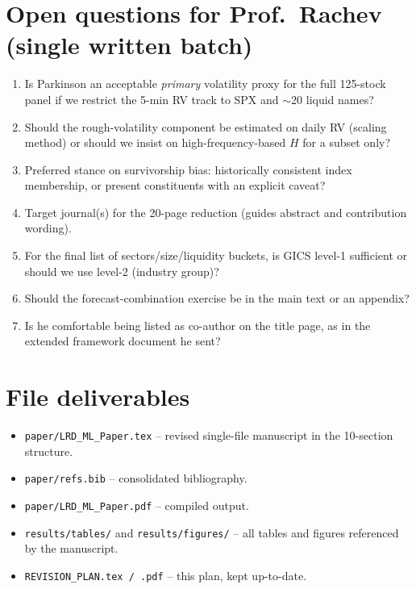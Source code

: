 \documentclass[11pt,a4paper]{article}
\begin{document}
\section{Open questions for Prof.\ Rachev (single written batch)}

\begin{enumerate}
  \item Is Parkinson an acceptable \emph{primary} volatility proxy for the
  full 125-stock panel if we restrict the 5-min RV track to SPX and
  $\sim$20 liquid names?
  \item Should the rough-volatility component be estimated on daily RV
  (scaling method) or should we insist on high-frequency-based $H$ for a
  subset only?
  \item Preferred stance on survivorship bias: historically consistent
  index membership, or present constituents with an explicit caveat?
  \item Target journal(s) for the 20-page reduction (guides abstract and
  contribution wording).
  \item For the final list of sectors/size/liquidity buckets, is GICS
  level-1 sufficient or should we use level-2 (industry group)?
  \item Should the forecast-combination exercise be in the main text or an
  appendix?
  \item Is he comfortable being listed as co-author on the title page, as
  in the extended framework document he sent?
\end{enumerate}

\section{File deliverables}

\begin{itemize}
  \item \texttt{paper/LRD\_ML\_Paper.tex} -- revised single-file manuscript
  in the 10-section structure.
  \item \texttt{paper/refs.bib} -- consolidated bibliography.
  \item \texttt{paper/LRD\_ML\_Paper.pdf} -- compiled output.
  \item \texttt{results/tables/} and \texttt{results/figures/} -- all
  tables and figures referenced by the manuscript.
  \item \texttt{REVISION\_PLAN.tex / .pdf} -- this plan, kept
  up-to-date.
\end{itemize}
\end{document}
